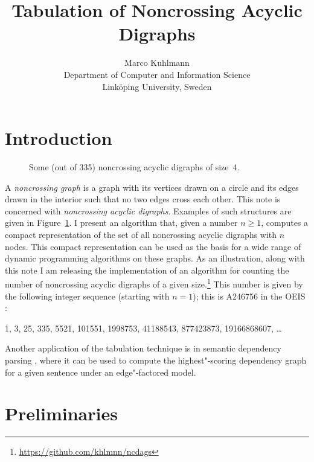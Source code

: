 \documentclass[a4paper]{article}
\begin{document}
\title{Tabulation of Noncrossing Acyclic Digraphs}

\author{%
	Marco Kuhlmann\\
	Department of Computer and Information Science\\
	Linköping University, Sweden}

\maketitle


\section{Introduction}

\begin{figure}
	\centering\footnotesize
	
	\caption{Some (out of 335) noncrossing acyclic digraphs of size~4.}
	\label{fig:ncdags-examples}
\end{figure}

A \emph{noncrossing graph} is a graph with its vertices drawn on a
circle and its edges drawn in the interior such that no two edges
cross each other.
This note is concerned with \emph{noncrossing acyclic digraphs}.
Examples of such structures are given in
Figure~\ref{fig:ncdags-examples}.
I present an algorithm that, given a number $n \geq 1$, computes a
compact representation of the set of all noncrossing acyclic digraphs
with $n$ nodes.
This compact representation can be used as the basis for a wide range
of dynamic programming algorithms on these graphs.
As an illustration, along with this note I am releasing the
implementation of an algorithm for counting the number of noncrossing
acyclic digraphs of a given
size.\footnote{\url{https://github.com/khlmnn/ncdags}} This number is
given by the following integer sequence (starting with $n = 1$); this
is A246756 in the OEIS \citep{oeis}:
\begin{center}
  1, 3, 25, 335, 5521, 101551, 1998753, 41188543, 877423873, 19166868607, \dots
\end{center}
Another application of the tabulation technique is in semantic
dependency parsing \citep{oepen2014broad}, where it can be used to
compute the highest"-scoring dependency graph for a given sentence
under an edge"-factored model.


\section{Preliminaries}
\end{document}
